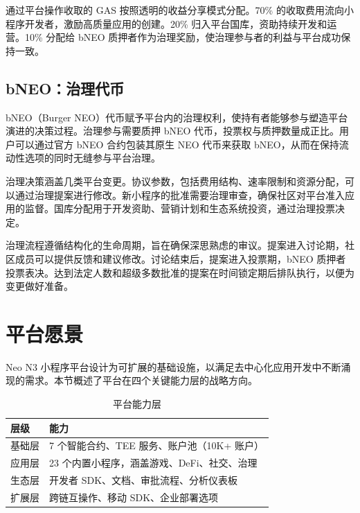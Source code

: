 \documentclass[11pt,a4paper]{article}
\begin{document}
通过平台操作收取的 GAS 按照透明的收益分享模式分配。70\% 的收取费用流向小程序开发者，激励高质量应用的创建。20\% 归入平台国库，资助持续开发和运营。10\% 分配给 bNEO 质押者作为治理奖励，使治理参与者的利益与平台成功保持一致。

\subsection{bNEO：治理代币}

bNEO（Burger NEO）代币赋予平台内的治理权利，使持有者能够参与塑造平台演进的决策过程。治理参与需要质押 bNEO 代币，投票权与质押数量成正比。用户可以通过官方 bNEO 合约包装其原生 NEO 代币来获取 bNEO，从而在保持流动性选项的同时无缝参与平台治理。

治理决策涵盖几类平台变更。协议参数，包括费用结构、速率限制和资源分配，可以通过治理提案进行修改。新小程序的批准需要治理审查，确保社区对平台准入应用的监督。国库分配用于开发资助、营销计划和生态系统投资，通过治理投票决定。

治理流程遵循结构化的生命周期，旨在确保深思熟虑的审议。提案进入讨论期，社区成员可以提供反馈和建议修改。讨论结束后，提案进入投票期，bNEO 质押者投票表决。达到法定人数和超级多数批准的提案在时间锁定期后排队执行，以便为变更做好准备。

\section{平台愿景}

Neo N3 小程序平台设计为可扩展的基础设施，以满足去中心化应用开发中不断涌现的需求。本节概述了平台在四个关键能力层的战略方向。

\begin{table}[h]
\centering
\caption{平台能力层}
\begin{tabular}{@{}lp{8cm}@{}}
\toprule
\textbf{层级} & \textbf{能力} \\
\midrule
基础层 & 7 个智能合约、TEE 服务、账户池（10K+ 账户） \\
应用层 & 23 个内置小程序，涵盖游戏、DeFi、社交、治理 \\
生态层 & 开发者 SDK、文档、审批流程、分析仪表板 \\
扩展层 & 跨链互操作、移动 SDK、企业部署选项 \\
\bottomrule
\end{tabular}
\label{tab:capabilities}
\end{table}
\end{document}
